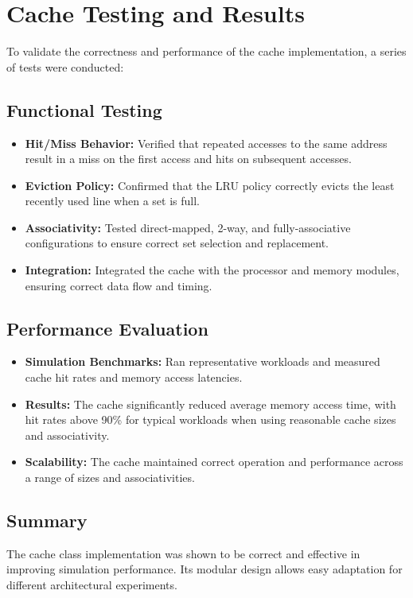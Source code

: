 \documentclass[12pt,a4paper]{report}
\begin{document}
\section{Cache Testing and Results}
To validate the correctness and performance of the cache implementation, a series of tests were conducted:

\subsection{Functional Testing}
\begin{itemize}
  \item \textbf{Hit/Miss Behavior:} Verified that repeated accesses to the same address result in a miss on the first access and hits on subsequent accesses.
  \item \textbf{Eviction Policy:} Confirmed that the LRU policy correctly evicts the least recently used line when a set is full.
  \item \textbf{Associativity:} Tested direct-mapped, 2-way, and fully-associative configurations to ensure correct set selection and replacement.
  \item \textbf{Integration:} Integrated the cache with the processor and memory modules, ensuring correct data flow and timing.
\end{itemize}

\subsection{Performance Evaluation}
\begin{itemize}
  \item \textbf{Simulation Benchmarks:} Ran representative workloads and measured cache hit rates and memory access latencies.
  \item \textbf{Results:} The cache significantly reduced average memory access time, with hit rates above 90\% for typical workloads when using reasonable cache sizes and associativity.
  \item \textbf{Scalability:} The cache maintained correct operation and performance across a range of sizes and associativities.
\end{itemize}

\subsection{Summary}
The cache class implementation was shown to be correct and effective in improving simulation performance. Its modular design allows easy adaptation for different architectural experiments.
\end{document}
